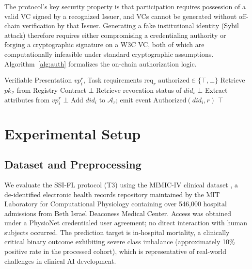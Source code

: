 \documentclass{sbc2023}
\begin{document}
The protocol's key security property is that participation requires possession of a valid VC signed by a recognized Issuer, and VCs cannot be generated without off-chain verification by that Issuer. Generating a fake institutional identity (Sybil attack) therefore requires either compromising a credentialing authority or forging a cryptographic signature on a W3C VC, both of which are computationally infeasible under standard cryptographic assumptions. Algorithm~\ref{alg:auth} formalizes the on-chain authorization logic.

\begin{algorithm}
\caption{On-Chain Participant Authorization (Phase 3)}
\label{alg:auth}
\begin{algorithmic}[1]
\REQUIRE Verifiable Presentation $vp_i^r$, Task requirements $\text{req}_r$
\ENSURE $\text{authorized} \in \{\top, \bot\}$
\STATE Retrieve $pk_\mathcal{I}$ from Registry Contract
 \RETURN $\bot$ \ENDIF
\STATE Retrieve revocation status of $did_i$
 \RETURN $\bot$ \ENDIF
\STATE Extract attributes from $vp_i^r$
 \RETURN $\bot$ \ENDIF
\STATE Add $did_i$ to $\mathcal{A}_r$; emit event $\text{Authorized}(did_i, r)$
\RETURN $\top$
\end{algorithmic}
\end{algorithm}


\section{Experimental Setup}
\label{sec:setup}

\subsection{Dataset and Preprocessing}

We evaluate the SSI-FL protocol (T3) using the MIMIC-IV clinical dataset \citep{johnson2020mimic}, a de-identified electronic health records repository maintained by the MIT Laboratory for Computational Physiology containing over 546,000 hospital admissions from Beth Israel Deaconess Medical Center. Access was obtained under a PhysioNet credentialed user agreement; no direct interaction with human subjects occurred. The prediction target is in-hospital mortality, a clinically critical binary outcome exhibiting severe class imbalance (approximately 10\% positive rate in the processed cohort), which is representative of real-world challenges in clinical AI development.
\end{document}
